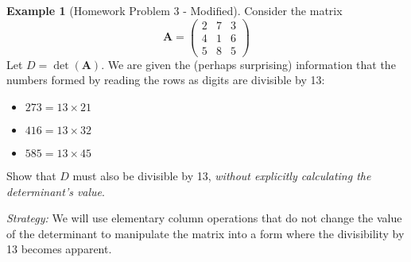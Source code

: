\documentclass[11pt]{article}
\theoremstyle{definition}
\newtheorem{example}[theorem]{Example}
\theoremstyle{remark}
\DeclareMathOperator{\det}{det}
\newcommand{\mat}[1]{\mathbf{#1}} %
\begin{document}
\begin{example}[Homework Problem 3 - Modified] \label{ex:det_divisibility}
Consider the matrix
\[ \mat{A} = \begin{pmatrix} 2 & 7 & 3 \\ 4 & 1 & 6 \\ 5 & 8 & 5 \end{pmatrix} \]
Let $D = \det(\mat{A})$. We are given the (perhaps surprising) information that the numbers formed by reading the rows as digits are divisible by 13:
\begin{itemize}
    \item $273 = 13 \times 21$
    \item $416 = 13 \times 32$
    \item $585 = 13 \times 45$
\end{itemize}
Show that $D$ must also be divisible by 13, \emph{without explicitly calculating the determinant's value}.

\textit{Strategy:} We will use elementary column operations that do not change the value of the determinant to manipulate the matrix into a form where the divisibility by 13 becomes apparent.


\end{example}
\end{document}
